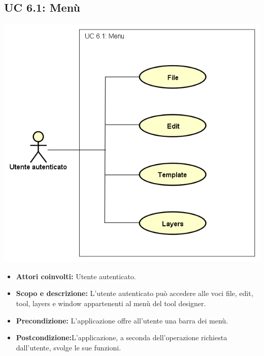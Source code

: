 \subsection{UC 6.1: Menù}
		\includegraphics[scale=0.8]{../../Casi D'uso/UC 6.1.png}
\begin{itemize}
		\item \textbf{Attori coinvolti:} Utente autenticato. \\
		\item \textbf{Scopo e descrizione:} L'utente autenticato può accedere alle voci file, edit, tool, layers e window appartenenti al menù del tool designer. \\
		\item \textbf{Precondizione:} L'applicazione offre all'utente una barra dei menù. \\
		\item \textbf{Postcondizione:}L'applicazione, a seconda dell'operazione richiesta dall'utente, svolge le sue funzioni. \\
\end{itemize}